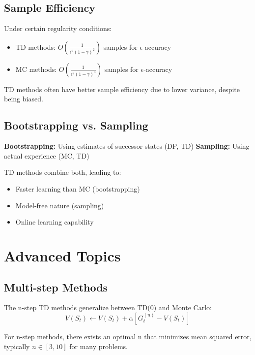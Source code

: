 \subsection{Sample Efficiency}

\begin{theorem}
Under certain regularity conditions:
\begin{itemize}
    \item TD methods: $O(\frac{1}{\epsilon^2(1-\gamma)^2})$ samples for $\epsilon$-accuracy
    \item MC methods: $O(\frac{1}{\epsilon^2(1-\gamma)^4})$ samples for $\epsilon$-accuracy
\end{itemize}
\end{theorem}

TD methods often have better sample efficiency due to lower variance, despite being biased.

\subsection{Bootstrapping vs. Sampling}

\textbf{Bootstrapping:} Using estimates of successor states (DP, TD)
\textbf{Sampling:} Using actual experience (MC, TD)

TD methods combine both, leading to:
\begin{itemize}
    \item Faster learning than MC (bootstrapping)
    \item Model-free nature (sampling)
    \item Online learning capability
\end{itemize}

\section{Advanced Topics}

\subsection{Multi-step Methods}

The n-step TD methods generalize between TD(0) and Monte Carlo:
\begin{equation}
V(S_t) \leftarrow V(S_t) + \alpha[G_t^{(n)} - V(S_t)]
\end{equation}

\begin{theorem}
For n-step methods, there exists an optimal n that minimizes mean squared error, typically $n \in [3, 10]$ for many problems.
\end{theorem}

